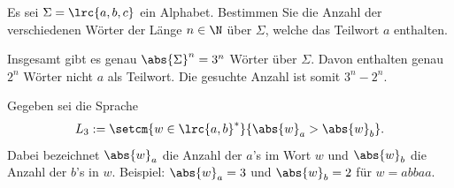 \begin{questions}

	Es sei $\Sigma = \lrc{a, b, c}$ ein Alphabet. Bestimmen Sie die Anzahl der verschiedenen Wörter der Länge $n\in\N$ über $\Sigma$, welche das Teilwort $a$ enthalten.
	\begin{solution}
		Insgesamt gibt es genau $\abs{\Sigma}^n = 3^n$ Wörter über $\Sigma$. Davon enthalten genau $2^n$ Wörter nicht $a$ als Teilwort. Die gesuchte Anzahl ist somit $3^n - 2^n$.
	\end{solution}
	\droptotalpoints
	\clearpage



	Gegeben sei die Sprache
	\begin{align*}
		L_3 := \setcm{w\in\lrc{a,b}^*}{\abs{w}_a > \abs{w}_b}.
	\end{align*}
	Dabei bezeichnet $\abs{w}_a$ die Anzahl der $a$'s im Wort $w$ und $\abs{w}_b$ die Anzahl der $b$'s in $w$. Beispiel: $\abs{w}_a = 3$ und $\abs{w}_b = 2$ für $w = abbaa$.
\end{questions}
